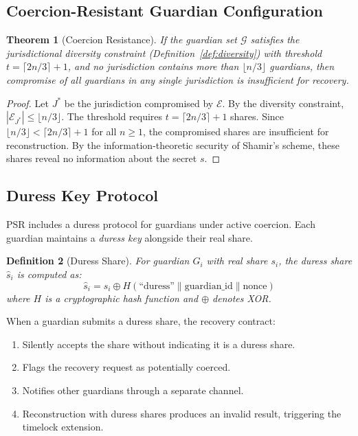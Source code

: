 \documentclass[11pt,a4paper,twocolumn]{article}
\newtheorem{theorem}{Theorem}[section]
\newtheorem{definition}[theorem]{Definition}
\begin{document}
\subsection{Coercion-Resistant Guardian Configuration}

\begin{theorem}[Coercion Resistance]\label{thm:coercion}
If the guardian set $\mathcal{G}$ satisfies the jurisdictional diversity constraint (Definition~\ref{def:diversity}) with threshold $t = \lceil 2n/3 \rceil + 1$, and no jurisdiction contains more than $\lfloor n/3 \rfloor$ guardians, then compromise of all guardians in any single jurisdiction is insufficient for recovery.
\end{theorem}

\begin{proof}
Let $J^*$ be the jurisdiction compromised by $\mathcal{E}$. By the diversity constraint, $|\mathcal{E}_{J^*}| \leq \lfloor n/3 \rfloor$. The threshold requires $t = \lceil 2n/3 \rceil + 1$ shares. Since $\lfloor n/3 \rfloor < \lceil 2n/3 \rceil + 1$ for all $n \geq 1$, the compromised shares are insufficient for reconstruction. By the information-theoretic security of Shamir's scheme, these shares reveal no information about the secret $s$.
\end{proof}

\subsection{Duress Key Protocol}

PSR includes a duress protocol for guardians under active coercion. Each guardian maintains a \emph{duress key} alongside their real share.

\begin{definition}[Duress Share]
For guardian $G_i$ with real share $s_i$, the duress share $\hat{s}_i$ is computed as:
\begin{equation}
  \hat{s}_i = s_i \oplus H(\text{``duress''} \| \text{guardian\_id} \| \text{nonce})
\end{equation}
where $H$ is a cryptographic hash function and $\oplus$ denotes XOR.
\end{definition}

When a guardian submits a duress share, the recovery contract:
\begin{enumerate}
  \item Silently accepts the share without indicating it is a duress share.
  \item Flags the recovery request as potentially coerced.
  \item Notifies other guardians through a separate channel.
  \item Reconstruction with duress shares produces an invalid result, triggering the timelock extension.
\end{enumerate}
\end{document}
